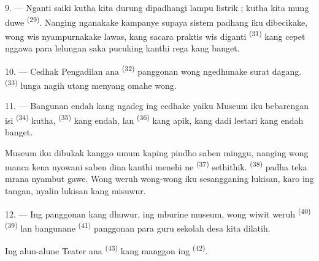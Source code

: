\VUsaut{4.0mm}
\VUsaut{3.4mm}

9. --- Nganti saiki kutha kita durung dipadhangi lampu listrik ; kutha
kita mung duwe  \textsuperscript{(29)}. Nanging
 nganakake kampanye supaya sistem padhang
iku dibecikake,  wong wis nyampurnakake   lawas, kang 
 sacara praktis wis diganti 
\textsuperscript{(31)} kang cepet nggawa para lelungan saka pucuking
 kanthi rega kang 
banget.

10. --- Cedhak Pengadilan ana  \textsuperscript{(32)}
panggonan wong ngedhunake surat dagang. 
\textsuperscript{(33)} lunga nagih utang menyang omahe wong.

\VUsaut{4.0mm}
\VUsaut{3.4mm}

11. --- Bangunan endah kang ngadeg ing cedhake yaiku 
Museum iku bebarengan isi  \textsuperscript{(34)}
kutha,  \textsuperscript{(35)} kang endah,
lan  \textsuperscript{(36)} kang apik, kang dadi
 lestari kang endah banget.

Museum iku dibukak kanggo umum kaping pindho saben minggu, nanging wong
manca kena nyowani saben dina kanthi menehi ne
\textsuperscript{(37)} sethithik. 
\textsuperscript{(38)} padha teka mrana nyambut gawe. Wong weruh
wong-wong iku  sesangganing lukisan, karo
 ing tangan, nyalin lukisan kang misuwur.

12. --- Ing panggonan kang dhuwur, ing mburine museum, wong wiwit weruh
 \textsuperscript{(40)} 
\textsuperscript{(39)} lan bangunane 
\textsuperscript{(41)} panggonan para guru sekolah desa kita dilatih.

Ing alun-alune Teater ana  \textsuperscript{(43)} kang
manggon ing  \textsuperscript{(42)}.

\VUsaut{5.0mm}
\VUsaut{3.0mm}

\VUsaut{3.4mm}
\VUsaut{3.4mm}

